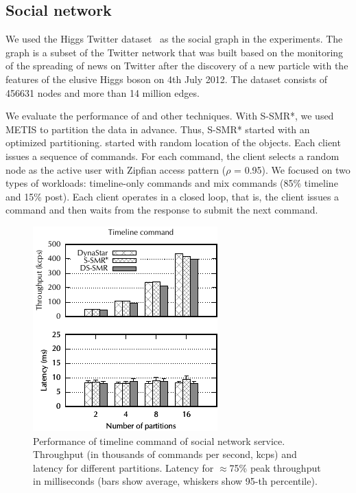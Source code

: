 \subsection{Social network}

We used the Higgs Twitter dataset~\cite{snapnets} as the social graph in the
experiments. The graph is a subset of the Twitter network that was built based
on the monitoring of the spreading of news on Twitter after the discovery of a
new particle with the features of the elusive Higgs boson on 4th July 2012. The
dataset consists of 456631 nodes and more than 14 million edges.

We evaluate the performance of \dynastar and other techniques. With S-SMR*, we
used METIS to partition the data in advance. Thus, S-SMR* started with an
optimized partitioning. \dynastar started with random location of the objects.
Each client issues a sequence of commands. For each command, the client selects
a random node as the active user with Zipfian access pattern ($\rho$ = 0.95). We
focused on two types of workloads: timeline-only commands and mix commands (85\%
timeline and 15\% post). Each client operates in a closed loop, that is, the
client issues a command and then waits from the response to submit the next
command.

\begin{figure}[ht!]
  \centering
    \includegraphics[width=0.6\columnwidth]{figures/experiments/dynastar/chirper-compare-timeline}
  \caption{Performance of timeline command of social network service. Throughput
  (in thousands of commands per second, kcps) and latency for different
  partitions. Latency for $\approx$75\% peak throughput in milliseconds (bars
  show average, whiskers show 95-th percentile).}
  \label{fig:socialscalability-timeline}
\end{figure}



